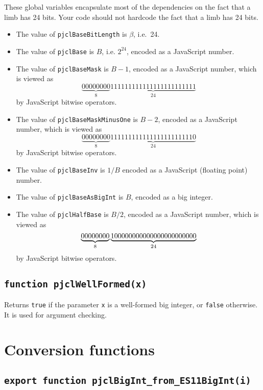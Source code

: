 \documentclass[12pt]{article}
\begin{document}
These global variables encapsulate most of the dependencies on the
fact that a limb has 24 bits.  Your code should not hardcode the fact
that a limb has 24 bits.
\begin{itemize}

\item The value of {\tt pjclBaseBitLength} is $\beta$, i.e.\ 24.

\item The value of {\tt pjclBase} is $B$, i.e. $2^{24}$, encoded as a JavaScript number.

\item The value of {\tt pjclBaseMask} is $B-1$, encoded as a JavaScript number,
which is viewed as
$$
\underbrace{00000000}_8\underbrace{111111111111111111111111}_{24}
$$
by JavaScript bitwise operators.

\item The value of {\tt pjclBaseMaskMinusOne} is $B-2$, encoded as a JavaScript number,
which is viewed as
$$
\underbrace{00000000}_8\underbrace{111111111111111111111110}_{24}
$$
by JavaScript bitwise operators.

\item The value of {\tt pjclBaseInv} is $1/B$ encoded as a JavaScript (floating point) number.

\item The value of {\tt pjclBaseAsBigInt} is $B$, encoded as a big integer.

\item The value of {\tt pjclHalfBase} is $B/2$, encoded as a JavaScript number,
which is viewed as
$$
\underbrace{00000000}_8\underbrace{100000000000000000000000\tt }_{24}
$$
by JavaScript bitwise operators.

\end{itemize}

\subsection{\tt function pjclWellFormed(x)}

Returns {\tt true} if the parameter {\tt x} is a well-formed big
integer, or {\tt false} otherwise.  It is used for argument checking.

\section{Conversion functions}

\subsection{\tt export function pjclBigInt\_from\_ES11BigInt(i)}
\end{document}
